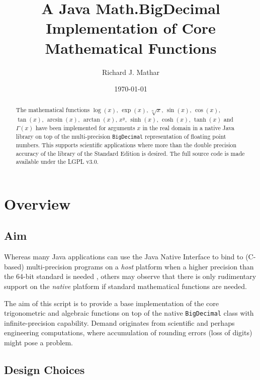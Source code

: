 \documentclass[showpacs,showkeys,amssymb,aps,twocolumn]{revtex4-1}
\begin{document}
\title[Java BigDecimalMath]{A Java Math.BigDecimal Implementation of Core Mathematical Functions}

\author{Richard J. Mathar}

\date{\today}

\begin{abstract}
The mathematical functions $\log(x)$, $\exp(x)$, $\sqrt[n]x$, $\sin(x)$, $\cos(x)$,
$\tan(x)$, $\arcsin(x)$, $\arctan(x)$, $x^y$, $\sinh(x)$, $\cosh(x)$, $\tanh(x)$ and $\Gamma(x)$ have been
implemented for arguments
$x$ in the real domain in a native Java library
on top of the multi-precision \texttt{BigDecimal} representation of floating point numbers. This supports
scientific applications where more than the double precision accuracy of the library
of the Standard Edition is desired. The full source code is made available under the LGPL v3.0.
\end{abstract}

\maketitle

\section{Overview}
\subsection{Aim}
Whereas many Java applications can use the Java Native Interface
to bind to (C-based) multi-precision programs on a \emph{host} platform
when a higher precision
than the 64-bit standard is needed \cite{FousseTOMS33}, others may observe that there is
only rudimentary
support on the \emph{native} platform if standard mathematical functions are needed.

The aim of this script is to provide a base implementation
of the core trigonometric and algebraic functions \cite{SmithTOMS17}
on top of the native
\texttt{BigDecimal} class with infinite-precision capability. Demand
originates from scientific and perhaps engineering computations, where accumulation
of rounding errors (loss of digits) might pose a problem.

\subsection{Design Choices}
\end{document}
